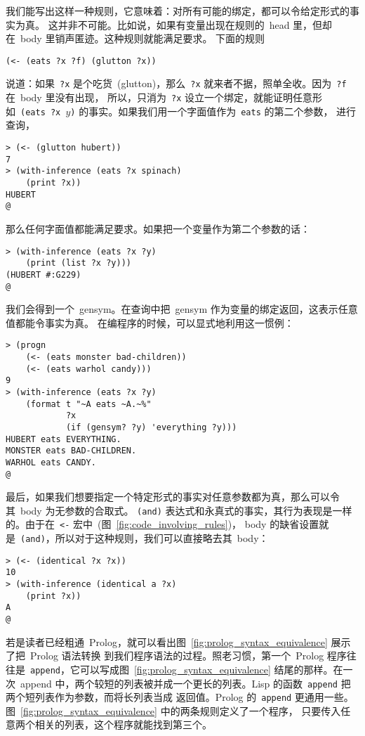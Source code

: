 我们能写出这样一种规则，它意味着：对所有可能的绑定，都可以令给定形式的事实为真。
这并非不可能。比如说，如果有变量出现在规则的~head 里，但却在~body 里销声匿迹。这种规则就能满足要求。
下面的规则
\begin{lstlisting}
(<- (eats ?x ?f) (glutton ?x))
\end{lstlisting}
说道：如果~\verb|?x| 是个吃货~(glutton)，那么~\verb|?x| 就来者不据，照单全收。因为~\verb|?f| 在~body 里没有出现，
所以，只消为~\verb|?x| 设立一个绑定，就能证明任意形如~\texttt{(eats ?x $y$)} 的事实。如果我们用一个字面值作为~\verb|eats| 的第二个参数，
进行查询，
\begin{lstlisting}
> (<- (glutton hubert))
7
> (with-inference (eats ?x spinach)
    (print ?x))
HUBERT
@
\end{lstlisting}
那么任何字面值都能满足要求。如果把一个变量作为第二个参数的话：

\begin{lstlisting}
> (with-inference (eats ?x ?y)
    (print (list ?x ?y)))
(HUBERT #:G229)
@
\end{lstlisting}
我们会得到一个~gensym。在查询中把~gensym 作为变量的绑定返回，这表示任意值都能令事实为真。
在编程序的时候，可以显式地利用这一惯例：
\begin{lstlisting}
> (progn
    (<- (eats monster bad-children))
    (<- (eats warhol candy)))
9
> (with-inference (eats ?x ?y)
    (format t "~A eats ~A.~%"
            ?x
            (if (gensym? ?y) 'everything ?y)))
HUBERT eats EVERYTHING.
MONSTER eats BAD-CHILDREN.
WARHOL eats CANDY.
@
\end{lstlisting}
最后，如果我们想要指定一个特定形式的事实对任意参数都为真，那么可以令其~body 为无参数的合取式。
\verb|(and)| 表达式和永真式的事实，其行为表现是一样的。由于在~\verb|<-| 宏中~(图~\ref{fig:code_involving_rules})，
body 的缺省设置就是~\verb|(and)|，所以对于这种规则，我们可以直接略去其~body：
\begin{lstlisting}
> (<- (identical ?x ?x))
10
> (with-inference (identical a ?x)
    (print ?x))
A
@
\end{lstlisting}

若是读者已经粗通~Prolog，就可以看出图~\ref{fig:prolog_syntax_equivalence} 展示了把~Prolog 语法转换
到我们程序语法的过程。照老习惯，第一个~Prolog 程序往往是~\verb|append|，它可以写成图~\ref{fig:prolog_syntax_equivalence} 结尾的那样。在一次~append 中，两个较短的列表被并成一个更长的列表。Lisp 的函数~\verb|append| 把两个短列表作为参数，而将长列表当成
返回值。Prolog 的~\verb|append| 更通用一些。图~\ref{fig:prolog_syntax_equivalence} 中的两条规则定义了一个程序，
只要传入任意两个相关的列表，这个程序就能找到第三个。

